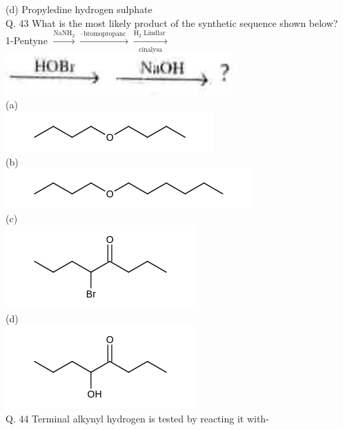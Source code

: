 \documentclass[10pt]{article}
\begin{document}
(d) Propyledine hydrogen sulphate\\
Q. 43 What is the most likely product of the synthetic sequence shown below?\\
1-Pentyne $\xrightarrow{\mathrm{NaNH}_{2}} \xrightarrow{\text {--bromopropanc }} \xrightarrow[\text { cinalysa }]{\mathrm{H}_{2} \text { Lindlar }}$\\
\includegraphics[max width=\textwidth, center]{2025_01_28_8470952b98110cec3aabg-232}\\
(a)\\
\includegraphics{smile-64131b1399678b9b216c62996d9e3053fb5c93fd}\\
(b)\\
\includegraphics{smile-9edf2d018ac3594467a762e3dace5488b1b0a417}\\
(c)\\
\includegraphics{smile-97ef258f79f35b4d9cce4b4793e32ca2a66cee2e}\\
(d)\\
\includegraphics{smile-830b380832687974645663ac8200daf1848ef1e2}\\
Q. 44 Terminal alkynyl hydrogen is tested by reacting it with-\\
\end{document}
